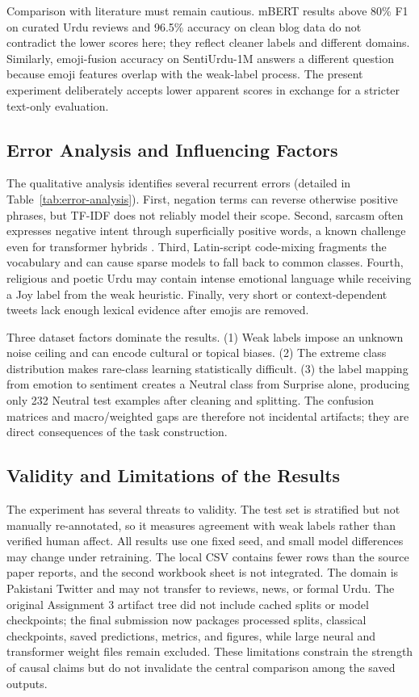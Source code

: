 \documentclass[conference]{IEEEtran}
\begin{document}
Comparison with literature must remain cautious. mBERT results above 80\% F1 on curated Urdu reviews \cite{khan2022multiclass} and 96.5\% accuracy on clean blog data \cite{saeed2024indepth} do not contradict the lower scores here; they reflect cleaner labels and different domains. Similarly, emoji-fusion accuracy on SentiUrdu-1M \cite{narejo2024emoji} answers a different question because emoji features overlap with the weak-label process. The present experiment deliberately accepts lower apparent scores in exchange for a stricter text-only evaluation.

\subsection{Error Analysis and Influencing Factors}
The qualitative analysis identifies several recurrent errors (detailed in Table~\ref{tab:error-analysis}). First, negation terms can reverse otherwise positive phrases, but TF-IDF does not reliably model their scope. Second, sarcasm often expresses negative intent through superficially positive words, a known challenge even for transformer hybrids \cite{hassan2024sarcasm}. Third, Latin-script code-mixing fragments the vocabulary and can cause sparse models to fall back to common classes. Fourth, religious and poetic Urdu may contain intense emotional language while receiving a Joy label from the weak heuristic. Finally, very short or context-dependent tweets lack enough lexical evidence after emojis are removed.

Three dataset factors dominate the results. (1) Weak labels impose an unknown noise ceiling and can encode cultural or topical biases. (2) The extreme class distribution makes rare-class learning statistically difficult. (3) the label mapping from emotion to sentiment creates a Neutral class from Surprise alone, producing only 232 Neutral test examples after cleaning and splitting. The confusion matrices and macro/weighted gaps are therefore not incidental artifacts; they are direct consequences of the task construction.

\subsection{Validity and Limitations of the Results}
The experiment has several threats to validity. The test set is stratified but not manually re-annotated, so it measures agreement with weak labels rather than verified human affect. All results use one fixed seed, and small model differences may change under retraining. The local CSV contains fewer rows than the source paper reports, and the second workbook sheet is not integrated. The domain is Pakistani Twitter and may not transfer to reviews, news, or formal Urdu. The original Assignment 3 artifact tree did not include cached splits or model checkpoints; the final submission now packages processed splits, classical checkpoints, saved predictions, metrics, and figures, while large neural and transformer weight files remain excluded. These limitations constrain the strength of causal claims but do not invalidate the central comparison among the saved outputs.
\end{document}
